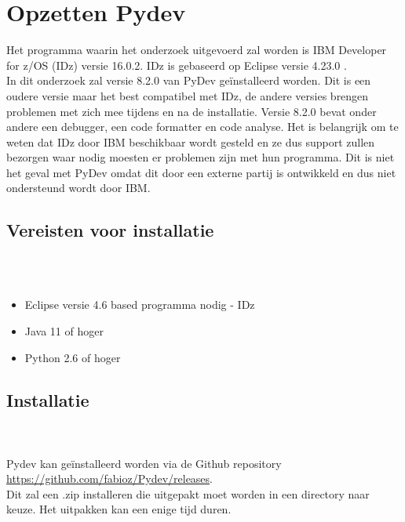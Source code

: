 
\chapter{Opzetten Pydev}
\label{ch:opzetten-pydev}

Het programma waarin het onderzoek uitgevoerd zal worden is IBM Developer for z/OS (IDz) versie 16.0.2. IDz is gebaseerd op Eclipse versie 4.23.0 . \\ In dit onderzoek zal versie 8.2.0 van PyDev geïnstalleerd worden. Dit is een oudere versie maar het best compatibel met IDz, de andere versies brengen problemen met zich mee tijdens en na de installatie.
Versie 8.2.0 bevat onder andere een debugger, een code formatter en code analyse. Het is belangrijk om te weten dat IDz door IBM beschikbaar wordt gesteld en ze dus support zullen bezorgen waar nodig moesten er problemen zijn met hun programma. Dit is niet het geval met PyDev omdat dit door een externe partij is ontwikkeld en dus niet ondersteund wordt door IBM. \\

\section{Vereisten voor installatie} 
\\ \\
\begin{itemize}
    \item Eclipse versie 4.6 based programma nodig - IDz
    \item Java 11 of hoger
    \item Python 2.6 of hoger
\end{itemize}


\section{Installatie} 
\\ \\
Pydev kan geïnstalleerd worden via de Github repository \url{https://github.com/fabioz/Pydev/releases}. \\Dit zal een .zip installeren die uitgepakt moet worden in een directory naar keuze. Het uitpakken kan een enige tijd duren. \\

